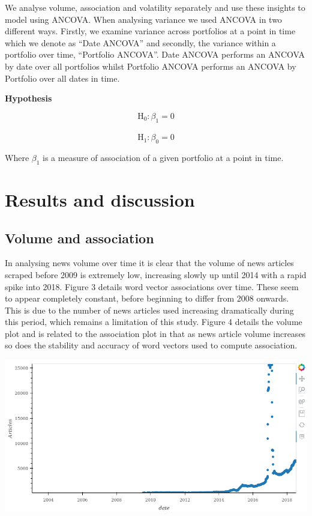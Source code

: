 \documentclass[11pt]{article}
\makeatletter
\def\maxwidth{\ifdim\Gin@nat@width>\linewidth\linewidth
    \else\Gin@nat@width\fi}
\let\Oldincludegraphics\includegraphics
\renewcommand{\includegraphics}[1]{\Oldincludegraphics[width=.8\maxwidth]{#1}}
\makeatother
\begin{document}
We analyse volume, association and volatility separately and use these
insights to model using ANCOVA. When analysing variance we used ANCOVA
in two different ways. Firstly, we examine variance across portfolios at
a point in time which we denote as ``Date ANCOVA'' and secondly, the
variance within a portfolio over time, ``Portfolio ANCOVA''. Date ANCOVA
performs an ANCOVA by date over all portfolios whilst Portfolio ANCOVA
performs an ANCOVA by Portfolio over all dates in time.

\textbf{Hypothesis}

\[\text{H}_{0}: \beta_{1} = 0 \]\\
\[\text{H}_{1}: \beta_{0} = 0 \]

Where \(\beta_{1}\) is a measure of association of a given portfolio at
a point in time.

\hypertarget{results-and-discussion}{%
\section{Results and discussion}\label{results-and-discussion}}

\hypertarget{volume-and-association}{%
\subsection{Volume and association}\label{volume-and-association}}

In analysing news volume over time it is clear that the volume of news
articles scraped before 2009 is extremely low, increasing slowly up
until 2014 with a rapid spike into 2018. Figure 3 details word vector
associations over time. These seem to appear completely constant, before
beginning to differ from 2008 onwards. This is due to the number of news
articles used increasing dramatically during this period, which remains
a limitation of this study. Figure 4 details the volume plot and is
related to the association plot in that as news article volume increases
so does the stability and accuracy of word vectors used to compute
association.

\includegraphics{../experiments/media/News Volume.png}
\end{document}
